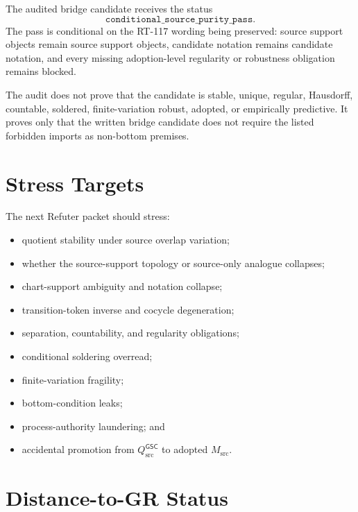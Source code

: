 \documentclass[11pt]{article}
\newcommand{\GSC}{\mathsf{GSC}}
\newcommand{\Msrc}{M_{\mathrm{src}}}
\newcommand{\Qsrc}{Q_{\mathrm{src}}}
\begin{document}
The audited bridge candidate receives the status
\[
  \texttt{conditional\_source\_purity\_pass}.
\]
The pass is conditional on the RT-117 wording being preserved: source support
objects remain source support objects, candidate notation remains candidate
notation, and every missing adoption-level regularity or robustness obligation
remains blocked.

The audit does not prove that the candidate is stable, unique, regular,
Hausdorff, countable, soldered, finite-variation robust, adopted, or
empirically predictive. It proves only that the written bridge candidate does
not require the listed forbidden imports as non-bottom premises.

\section{Stress Targets}

The next Refuter packet should stress:

\begin{itemize}
  \item quotient stability under source overlap variation;
  \item whether the source-support topology or source-only analogue collapses;
  \item chart-support ambiguity and notation collapse;
  \item transition-token inverse and cocycle degeneration;
  \item separation, countability, and regularity obligations;
  \item conditional soldering overread;
  \item finite-variation fragility;
  \item bottom-condition leaks;
  \item process-authority laundering; and
  \item accidental promotion from \(\Qsrc^{\GSC}\) to adopted \(\Msrc\).
\end{itemize}

\section{Distance-to-GR Status}
\end{document}
